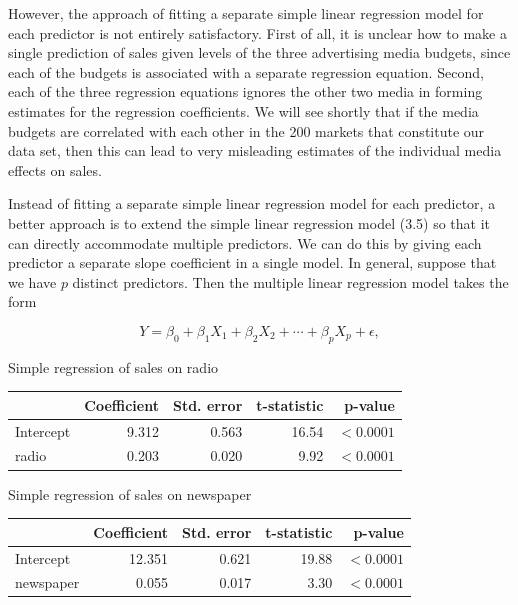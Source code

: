 \documentclass[10pt]{article}
\begin{document}
However, the approach of fitting a separate simple linear regression model for each predictor is not entirely satisfactory. First of all, it is unclear how to make a single prediction of sales given levels of the three advertising media budgets, since each of the budgets is associated with a separate regression equation. Second, each of the three regression equations ignores the other two media in forming estimates for the regression coefficients. We will see shortly that if the media budgets are correlated with each other in the 200 markets that constitute our data set, then this can lead to very misleading estimates of the individual media effects on sales.

Instead of fitting a separate simple linear regression model for each predictor, a better approach is to extend the simple linear regression model (3.5) so that it can directly accommodate multiple predictors. We can do this by giving each predictor a separate slope coefficient in a single model. In general, suppose that we have $p$ distinct predictors. Then the multiple linear regression model takes the form


\begin{equation*}
Y=\beta_{0}+\beta_{1} X_{1}+\beta_{2} X_{2}+\cdots+\beta_{p} X_{p}+\epsilon, \tag{3.19}
\end{equation*}


Simple regression of sales on radio

\begin{center}
\begin{tabular}{l|rrrr}
\hline
 & Coefficient & Std. error & t-statistic & p-value \\
\hline
Intercept & 9.312 & 0.563 & 16.54 & $<0.0001$ \\
radio & 0.203 & 0.020 & 9.92 & $<0.0001$ \\
\hline
\end{tabular}
\end{center}

Simple regression of sales on newspaper

\begin{center}
\begin{tabular}{l|rrrr}
\hline
 & Coefficient & Std. error & t-statistic & p-value \\
\hline
Intercept & 12.351 & 0.621 & 19.88 & $<0.0001$ \\
newspaper & 0.055 & 0.017 & 3.30 & $<0.0001$ \\
\hline
\end{tabular}
\end{center}
\end{document}
